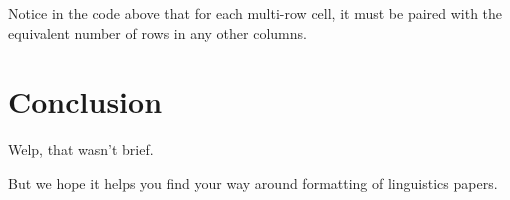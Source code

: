 \documentclass{article}
\begin{document}
Notice in the code above that for each multi-row cell, it must be paired with the equivalent number of rows in any other columns. %

\section{Conclusion}

Welp, that wasn't brief. %

\noindent But we hope it helps you find your way around formatting of linguistics papers. 



\end{document}
